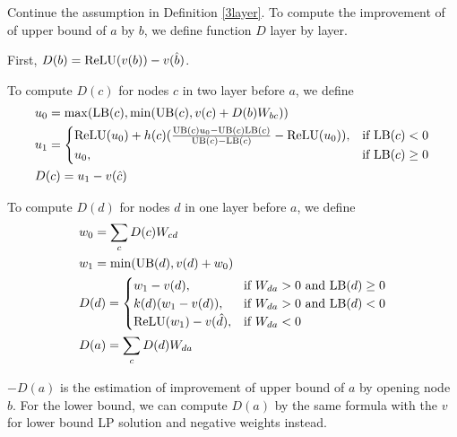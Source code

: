 \begin{definition}
	Continue the assumption in Definition \ref{3layer}. To compute the improvement of of upper bound of $a$ by $b$, we define function $D$ layer by layer.
	
	First, $D(b) = \mathrm{ReLU}(v(b))-v(\hat{b})$.
	
To compute $D(c)$ for nodes $c$ in two layer before $a$, we define \begin{align}
	&u_0 = \max(\mathrm{LB}(c),\min(\mathrm{UB}(c),  v(c)+D(b)W_{bc}))\\
	&u_1 = \begin{cases}
		\mathrm{ReLU}(u_0)+h(c)(\frac{\mathrm{UB}(c)u_0-\mathrm{UB}(c)\mathrm{LB}(c)}{\mathrm{UB}(c)-\mathrm{LB}(c)}-\mathrm{ReLU}(u_0)), & \text{if }\mathrm{LB}(c) < 0\\
	u_0, & \text{if }  \mathrm{LB}(c) \geq 0
	\end{cases}\\
	&D(c) = u_1-v(\hat{c})
\end{align}
	
	To compute $D(d)$ for nodes $d$ in one layer before $a$, we define 
	\begin{align}
		&w_0 = \sum_c D(c)W_{cd}\\
		&w_1 = \min(\mathrm{UB}(d),v(d)+w_0)\\		
		&D(d) =
		\begin{cases}
			w_1-v({d}), & \text{if }W_{da} > 0 \text{ and } \mathrm{LB}(d)\geq 0\\
		k(d)(w_1-v({d})), & \text{if }W_{da} > 0 \text{ and } \mathrm{LB}(d)< 0\\
		\mathrm{ReLU}(w_1)-v(\hat{d})	, & \text{if }  W_{da} < 0
		\end{cases}\\
		&D(a) = \sum_c D(d)W_{da}
	\end{align}
\end{definition} $-D(a)$ is the estimation of improvement of upper bound of $a$ by opening node $b$.  For the lower bound, we can compute $D(a)$ by the same formula with the $v$ for lower bound LP solution and negative weights  instead.
		